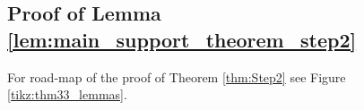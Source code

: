 \documentclass[12pt]{article}
\theoremstyle{remark}
\newcommand{\wtilde}[1]{\widetilde{#1}}
\begin{document}


% 
% 

% 

% 


% 


\subsection{Proof of Lemma \ref{lem:main_support_theorem_step2}}\label{subsubsec:proof of main support lemma}
 

 For road-map of the proof of Theorem \ref{thm:Step2} see Figure \ref{tikz:thm33_lemmas}.
 
\end{document}
